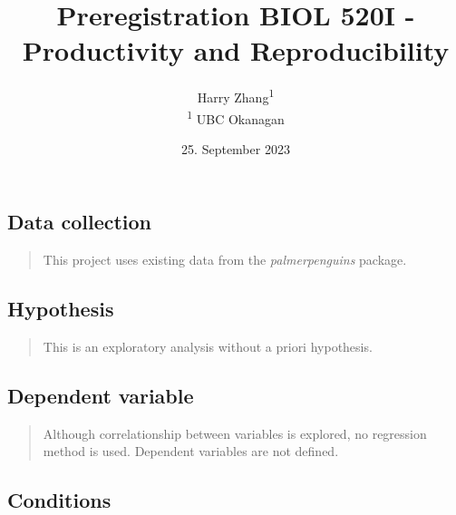 \documentclass[]{article}
\title{Preregistration BIOL 520I - Productivity and Reproducibility}
\author{
          Harry Zhang\textsuperscript{1}          \\ \vspace{0.5cm}
              \textsuperscript{1} UBC Okanagan      }
\date{25. September 2023}
\newcounter{question}
\begin{document}
\maketitle
\vspace{2pc}


\ifPDFTeX
  \newcommand\Question[2]{%
   \leavevmode\par
   \stepcounter{question}
   \noindent
   \textbf{\thequestion. #1}. #2\par}
\else %
  \NewCommandCopy{\oldQuestion}{\Question}
  \renewcommand\Question[2]{%
   \leavevmode\par
   \stepcounter{question}
   \noindent
   \textbf{\thequestion. #1}. #2\par}
\fi



\newcommand\Answer[1]{%
    \noindent
    \textit{Registered response}: #1\par}

\hypertarget{data-collection}{%
\subsection{Data collection}\label{data-collection}}

\begin{quote}
This project uses existing data from the \emph{palmerpenguins} package.
\end{quote}

\hypertarget{hypothesis}{%
\subsection{Hypothesis}\label{hypothesis}}

\begin{quote}
This is an exploratory analysis without a priori hypothesis.
\end{quote}

\hypertarget{dependent-variable}{%
\subsection{Dependent variable}\label{dependent-variable}}

\begin{quote}
Although correlationship between variables is explored, no regression
method is used. Dependent variables are not defined.
\end{quote}

\hypertarget{conditions}{%
\subsection{Conditions}\label{conditions}}
\end{document}
